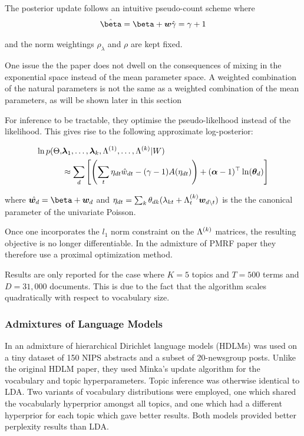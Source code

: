 The posterior update follows an intuitive pseudo-count scheme where
\begin{align}
\hat{\vv{\beta}} = \vv{\beta} + \vv{w}
\hat{\gamma}     = \gamma + 1
\end{align}

and the norm weightings $\rho_\lambda$ and $\rho$ are kept fixed.

One issue the the paper does not dwell on the consequences of mixing in the exponential space instead of the mean parameter space. A weighted combination of the natural parameters is not the same as a weighted combination of the mean parameters, as will be shown later in this section

For inference to be tractable, they optimise the pseudo-likelhood instead of the likelihood. This gives rise to the following approximate log-posterior:

\begin{align}
\begin{split}
\ln p(\Theta, & \bm \lambda_1, \ldots, \bm \lambda_k, \Lambda^{(1)}, \ldots, \Lambda^{(k)} | W) \\
& \approx \sum_d \left[ \left( \sum_t \eta_{dt} \hat{w}_{dt} - (\gamma - 1)A(\eta_{dt}) \right) + (\bm \alpha - 1)^\top\ln({ \bm \theta_d }) \right]
\end{split}
\end{align}

where $\hat{\wdoc} = \vv{\beta} + \wdoc$ and $\eta_{dt} = \sum_k { \theta_{dk} } (\lambda_{kt} + \Lambda^{(k)}_t \bm w_{d \setminus t})$ is the the canonical parameter of the univariate Poisson.


Once one incorporates the $l_1$ norm constraint on the $\Lambda^{(k)}$ matrices, the resulting objective is no longer differentiable. In the admixture of PMRF paper they therefore use a proximal optimization method.


Results are only reported for the case where $K=5$ topics and $T=500$ terms and $D=31,000$ documents. This is due to the fact that the algorithm scales quadratically with respect to vocabulary size. 



\subsubsection*{Admixtures of Language Models}
In \cite{Wallach2006} an admixture of hierarchical Dirichlet language models (HDLMs)\cite{MacKay1995} was used on a tiny dataset of 150 NIPS abstracts and a subset of 20-newsgroup posts. Unlike the original HDLM paper, they used Minka's update algorithm\cite{Minka2002} for the vocabulary and topic hyperparameters. Topic inference was otherwise identical to LDA. Two variants of vocabulary distributions were employed, one which shared the vocabularly hyperprior amongst all topics, and one which had a different hyperprior for each topic which gave better results. Both models provided better perplexity results than LDA.


